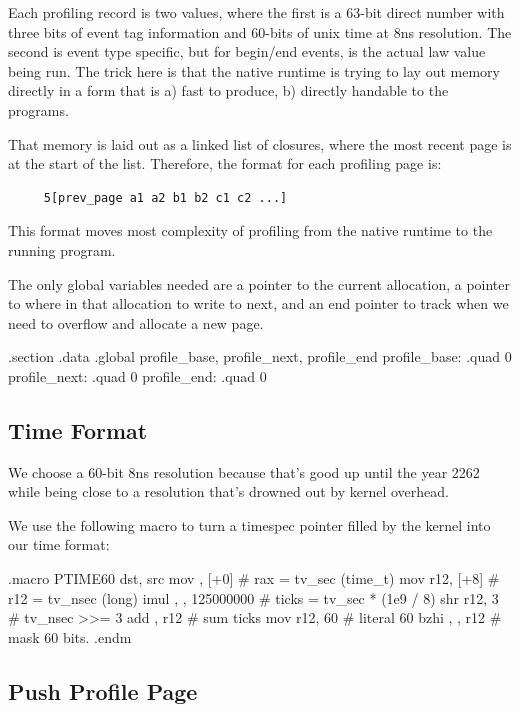 Each profiling record is two values, where the first is a 63-bit direct number
with three bits of event tag information and 60-bits of unix time at 8ns
resolution. The second is event type specific, but for begin/end events, is the
actual law value being run. The trick here is that the native runtime is trying
to lay out memory directly in a form that is a) fast to produce, b) directly
handable to the programs.

That memory is laid out as a linked list of closures, where the most recent
page is at the start of the list. Therefore, the format for each profiling page
is:

\begin{verbatim}
     5[prev_page a1 a2 b1 b2 c1 c2 ...]
\end{verbatim}

This format moves most complexity of profiling from the native runtime to the
running program.

The only global variables needed are a pointer to the current allocation, a
pointer to where in that allocation to write to next, and an end pointer to
track when we need to overflow and allocate a new page.

\begin{asmdata}
.section .data
.global profile_base, profile_next, profile_end
profile_base:	.quad 0
profile_next:	.quad 0
profile_end:	.quad 0
\end{asmdata}

\subsection{Time Format}

We choose a 60-bit 8ns resolution because that's good up until the year 2262
while being close to a resolution that's drowned out by kernel overhead.

We use the following macro to turn a timespec pointer filled by the kernel into
our time format:

\begin{asm}
.macro PTIME60 dst, src
	mov	\dst, [\src+0]		     #   rax = tv_sec (time_t)
	mov	r12, [\src+8]		     #   r12 = tv_nsec (long)
	imul	\dst, \dst, 125000000	     #   ticks = tv_sec * (1e9 / 8)
	shr	r12, 3			     #   tv_nsec >>= 3
	add	\dst, r12		     #   sum ticks
	mov	r12, 60			     #   literal 60
	bzhi	\dst, \dst, r12		     #   mask 60 bits.
.endm
\end{asm}

\subsection{Push Profile Page}


